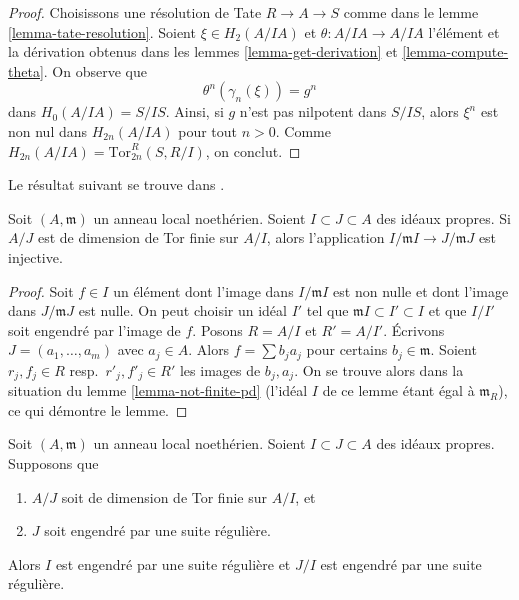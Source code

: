 \begin{proof}
Choisissons une résolution de Tate $R \to A \to S$ comme
dans le lemme \ref{lemma-tate-resolution}.
Soient $\xi\in H_2(A/IA)$ et $\theta : A/IA \to A/IA$ l'élément et la
dérivation obtenus dans les lemmes \ref{lemma-get-derivation} et
\ref{lemma-compute-theta}.
On observe que
$$
\theta^n(\gamma_n(\xi)) = g^n
$$
dans $H_0(A/IA) = S/IS$.
Ainsi, si $g$ n'est pas nilpotent dans $S/IS$, alors $\xi^n$ est non nul dans
$H_{2n}(A/IA)$ pour tout $n > 0$. Comme
$H_{2n}(A/IA) = \text{Tor}^R_{2n}(S, R/I)$, on conclut.
\end{proof}

\noindent
Le résultat suivant se trouve dans \cite{Rodicio}.

\begin{lemma}
\label{lemma-injective}
Soit $(A, \mathfrak m)$ un anneau local noethérien. Soient
$I \subset J \subset A$ des idéaux propres. Si $A/J$ est de
dimension de Tor finie sur $A/I$, alors l'application $I/\mathfrak m I \to J/\mathfrak m J$
est injective.
\end{lemma}

\begin{proof}
Soit $f \in I$ un élément dont l'image dans $I/\mathfrak m I$
est non nulle et dont l'image dans $J/\mathfrak mJ$ est nulle. On peut choisir un idéal $I'$
tel que $\mathfrak mI \subset I' \subset I$ et que $I/I'$ soit engendré
par l'image de $f$. Posons $R = A/I$ et $R' = A/I'$. Écrivons $J = (a_1, \ldots, a_m)$
avec $a_j \in A$. Alors $f = \sum b_j a_j$ pour certains $b_j \in\mathfrak m$.
Soient $r_j, f_j \in R$ resp.\ $r'_j, f'_j \in R'$ les images de $b_j, a_j$.
On se trouve alors
dans la situation du lemme \ref{lemma-not-finite-pd}
(l'idéal $I$ de ce lemme étant égal à $\mathfrak m_R$),
ce qui démontre le lemme.
\end{proof}

\begin{lemma}
\label{lemma-regular-sequence}
Soit $(A, \mathfrak m)$ un anneau local noethérien. Soient
$I \subset J \subset A$ des idéaux propres. Supposons que
\begin{enumerate}
\item $A/J$ soit de dimension de Tor finie sur $A/I$, et
\item $J$ soit engendré par une suite régulière.
\end{enumerate}
Alors $I$ est engendré par une suite régulière et $J/I$
est engendré par une suite régulière.
\end{lemma}

